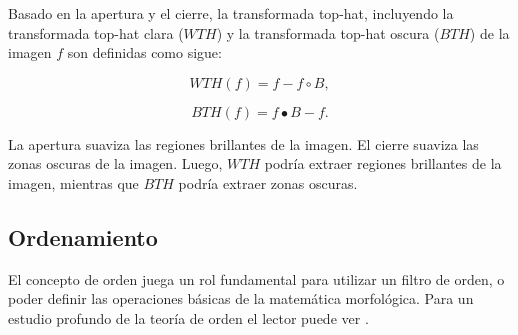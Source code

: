 Basado en la apertura y el cierre, la transformada top-hat, incluyendo la transformada top-hat clara ($WTH$) y la transformada top-hat oscura ($BTH$)  de la imagen $f$ son definidas como sigue:

\begin{equation}
WTH(f) = f - f\circ B,
\end{equation}

\begin{equation}
BTH(f) = f\bullet B - f. 
\end{equation}

La apertura suaviza las regiones brillantes de la imagen. El cierre suaviza las zonas oscuras de la imagen. Luego, $WTH$ podr\'ia extraer regiones brillantes de la imagen, mientras que $BTH$ podr\'ia extraer zonas oscuras.


\subsection{Ordenamiento}
El concepto de orden juega un rol fundamental para utilizar un filtro de orden, o poder definir las operaciones b\'asicas de la matem\'atica morfol\'ogica. Para un estudio profundo de la teor\'ia de orden el lector puede ver \cite{serra1993anamorphoses}.


  

